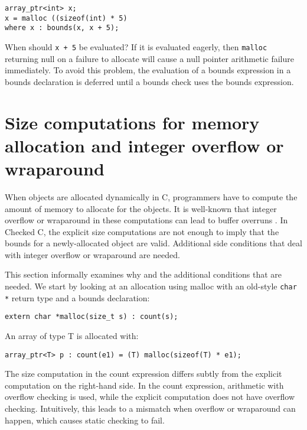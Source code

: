 \begin{verbatim}
array_ptr<int> x;
x = malloc ((sizeof(int) * 5)
where x : bounds(x, x + 5);
\end{verbatim}

When should \texttt{x + 5} be evaluated? If it is evaluated eagerly,
then \texttt{malloc} returning null on a failure to allocate will cause
a null pointer arithmetic failure immediately. To avoid this problem,
the evaluation of a bounds expression in a bounds declaration is
deferred until a bounds check uses the bounds expression.

\section{Size computations for memory allocation and integer overflow or wraparound}
\label{section:integer-overflow-informal}

When objects are allocated dynamically in C, programmers have to compute
the amount of memory to allocate for the objects. It is well-known 
\cite{Howard2003,Mitre2015-128,Mitre2015-190,Mitre2015-680} 
that integer overflow or wraparound in these computations can lead to buffer
overruns . In Checked C, the explicit size computations are not enough
to imply that the bounds for a newly-allocated object are valid.
Additional side conditions that deal with integer overflow or wraparound
are needed.

This section informally examines why and the additional conditions that
are needed. We start by looking at an allocation using malloc with an
old-style \texttt{char *} return type and a bounds declaration:

\begin{verbatim}
extern char *malloc(size_t s) : count(s);
\end{verbatim}

An array of type T is allocated with:

\begin{verbatim}
array_ptr<T> p : count(e1) = (T) malloc(sizeof(T) * e1);
\end{verbatim}

The size computation in the count expression differs subtly from the
explicit computation on the right-hand side. In the count expression,
arithmetic with overflow checking is used, while the explicit
computation does not have overflow checking. Intuitively, this leads to
a mismatch when overflow or wraparound can happen, which causes static
checking to fail.


